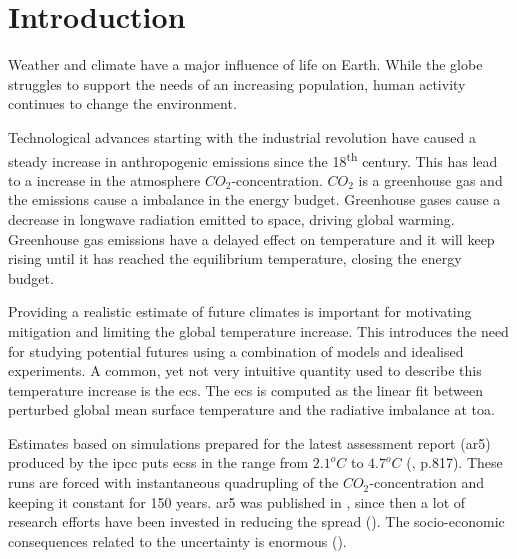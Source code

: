 \chapter{Introduction} \label{ch:introduction}
Weather and climate have a major influence of life on Earth. While the globe struggles to support the needs of an increasing population, human activity continues to change the environment. %

Technological advances starting with the industrial revolution have caused a steady increase in anthropogenic emissions since the 18\textsuperscript{th} century. %
This has lead to a increase in the atmosphere $CO_2$-concentration. $CO_2$ is a greenhouse gas and the emissions cause a imbalance in the energy budget. Greenhouse gases cause a decrease in longwave radiation emitted to space, driving global warming. Greenhouse gas emissions have a delayed effect on temperature and it will keep rising until it has reached the equilibrium temperature, closing the energy budget. 

Providing a realistic estimate of future climates is important for motivating mitigation and limiting the global temperature increase. 
This introduces the need for studying potential futures using a combination of models and idealised experiments. A common, yet not very intuitive quantity used to describe this temperature increase is the \acrfull{ecs}. 
The \acrshort{ecs} is computed as the linear fit between perturbed global mean surface temperature and the radiative imbalance at \acrfull{toa}. 

Estimates based on %
simulations prepared for the latest assessment report (\acrshort{ar5}) produced by the \acrfull{ipcc} puts \acrshort{ecs}s in the range from $2.1^oC$ to $4.7^oC$ (\cite{IPCC_CH9_climate_models}, p.817). These runs are forced with instantaneous quadrupling of the $CO_2$-concentration %
and keeping it constant for 150 years.  
\acrshort{ar5} was published in \citeyear{IPCC_entire_book}, since then a lot of research efforts have been invested in reducing the spread (\cite{Cox2018}). %
The socio-economic consequences related to the uncertainty is enormous (\cite{bony2015}). 

